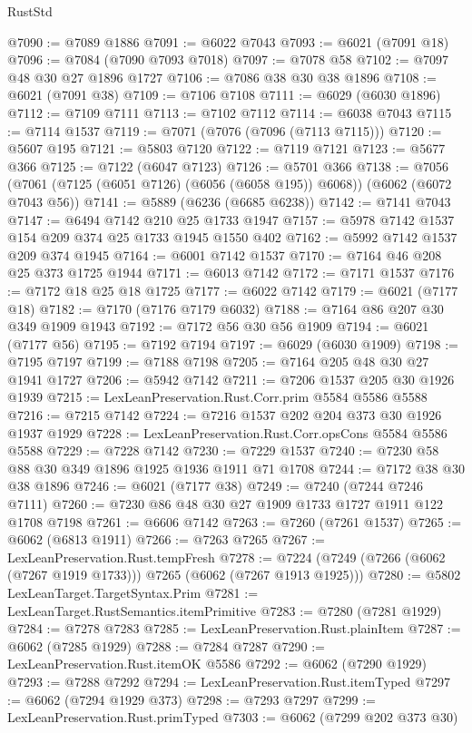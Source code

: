 \begin{lexlean}{RustStd}
\begin{coremodule}
@7090 := @7089 @1886
@7091 := @6022 @7043
@7093 := @6021 (@7091 @18)
@7096 := @7084 (@7090 @7093 @7018)
@7097 := @7078 @58
@7102 := @7097 @48 @30 @27 @1896 @1727
@7106 := @7086 @38 @30 @38 @1896
@7108 := @6021 (@7091 @38)
@7109 := @7106 @7108
@7111 := @6029 (@6030 @1896)
@7112 := @7109 @7111
@7113 := @7102 @7112
@7114 := @6038 @7043
@7115 := @7114 @1537
@7119 := @7071 (@7076 (@7096 (@7113 @7115)))
@7120 := @5607 @195
@7121 := @5803 @7120
@7122 := @7119 @7121
@7123 := @5677 @366
@7125 := @7122 (@6047 @7123)
@7126 := @5701 @366
@7138 := @7056 (@7061 (@7125 (@6051 @7126) (@6056 (@6058 @195)) @6068)) (@6062 (@6072 @7043 @56))
@7141 := @5889 (@6236 (@6685 @6238))
@7142 := @7141 @7043
@7147 := @6494 @7142 @210 @25 @1733 @1947
@7157 := @5978 @7142 @1537 @154 @209 @374 @25 @1733 @1945 @1550 @402
@7162 := @5992 @7142 @1537 @209 @374 @1945
@7164 := @6001 @7142 @1537
@7170 := @7164 @46 @208 @25 @373 @1725 @1944
@7171 := @6013 @7142
@7172 := @7171 @1537
@7176 := @7172 @18 @25 @18 @1725
@7177 := @6022 @7142
@7179 := @6021 (@7177 @18)
@7182 := @7170 (@7176 @7179 @6032)
@7188 := @7164 @86 @207 @30 @349 @1909 @1943
@7192 := @7172 @56 @30 @56 @1909
@7194 := @6021 (@7177 @56)
@7195 := @7192 @7194
@7197 := @6029 (@6030 @1909)
@7198 := @7195 @7197
@7199 := @7188 @7198
@7205 := @7164 @205 @48 @30 @27 @1941 @1727
@7206 := @5942 @7142
@7211 := @7206 @1537 @205 @30 @1926 @1939
@7215 := LexLeanPreservation.Rust.Corr.prim @5584 @5586 @5588
@7216 := @7215 @7142
@7224 := @7216 @1537 @202 @204 @373 @30 @1926 @1937 @1929
@7228 := LexLeanPreservation.Rust.Corr.opsCons @5584 @5586 @5588
@7229 := @7228 @7142
@7230 := @7229 @1537
@7240 := @7230 @58 @88 @30 @349 @1896 @1925 @1936 @1911 @71 @1708
@7244 := @7172 @38 @30 @38 @1896
@7246 := @6021 (@7177 @38)
@7249 := @7240 (@7244 @7246 @7111)
@7260 := @7230 @86 @48 @30 @27 @1909 @1733 @1727 @1911 @122 @1708 @7198
@7261 := @6606 @7142
@7263 := @7260 (@7261 @1537)
@7265 := @6062 (@6813 @1911)
@7266 := @7263 @7265
@7267 := LexLeanPreservation.Rust.tempFresh
@7278 := @7224 (@7249 (@7266 (@6062 (@7267 @1919 @1733))) @7265 (@6062 (@7267 @1913 @1925)))
@7280 := @5802 LexLeanTarget.TargetSyntax.Prim
@7281 := LexLeanTarget.RustSemantics.itemPrimitive
@7283 := @7280 (@7281 @1929)
@7284 := @7278 @7283
@7285 := LexLeanPreservation.Rust.plainItem
@7287 := @6062 (@7285 @1929)
@7288 := @7284 @7287
@7290 := LexLeanPreservation.Rust.itemOK @5586
@7292 := @6062 (@7290 @1929)
@7293 := @7288 @7292
@7294 := LexLeanPreservation.Rust.itemTyped
@7297 := @6062 (@7294 @1929 @373)
@7298 := @7293 @7297
@7299 := LexLeanPreservation.Rust.primTyped
@7303 := @6062 (@7299 @202 @373 @30)

\end{coremodule}
\end{lexlean}
